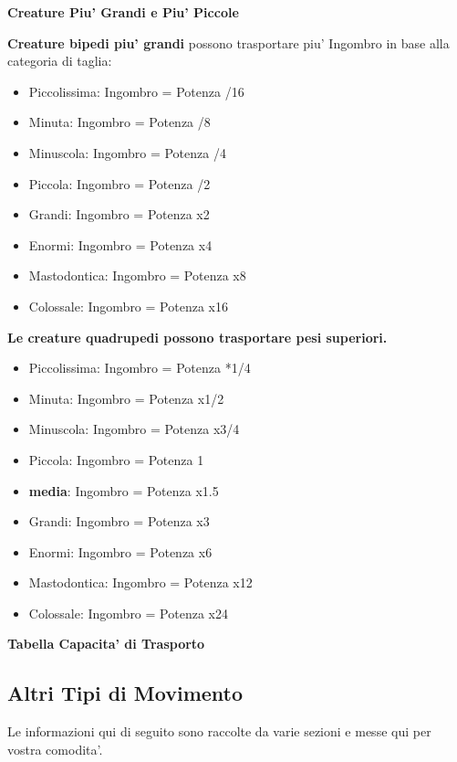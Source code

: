 \documentclass[a4paper,11pt,twoside,openany]{book}
\begin{document}
{		
		\textbf{Creature Piu' Grandi e Piu' Piccole}
		
		\textbf{Creature bipedi piu' grandi} possono trasportare piu' Ingombro in base alla categoria di taglia:
		
		\begin{itemize}
			\item Piccolissima: Ingombro = Potenza /16
			\item Minuta: Ingombro = Potenza /8
			\item Minuscola: Ingombro = Potenza /4
			\item Piccola: Ingombro = Potenza /2
			\item Grandi: Ingombro = Potenza x2
			\item Enormi: Ingombro = Potenza x4
			\item Mastodontica: Ingombro = Potenza x8
			\item Colossale: Ingombro = Potenza x16
		\end{itemize}
		
		\bigskip
		
		
		\textbf{Le creature quadrupedi possono trasportare pesi superiori. }
		
		
		\begin{itemize}
			\item Piccolissima: Ingombro = Potenza *1/4
			\item Minuta: Ingombro = Potenza x1/2
			\item Minuscola: Ingombro = Potenza x3/4
			\item Piccola: Ingombro = Potenza 1
			\item \textbf{media}: Ingombro = Potenza x1.5
			\item Grandi: Ingombro = Potenza x3
			\item Enormi: Ingombro = Potenza x6
			\item Mastodontica: Ingombro = Potenza x12
			\item Colossale: Ingombro = Potenza x24
		\end{itemize}
		
		\bigskip
		
		\textbf{Tabella Capacita' di Trasporto}
		
		
		\subsection{Altri Tipi di Movimento}
		
		\label{altri-tipi-di-movimento}
		
		Le informazioni qui di seguito sono raccolte da varie sezioni e messe
		qui per vostra comodita'.
		
}
\end{document}
